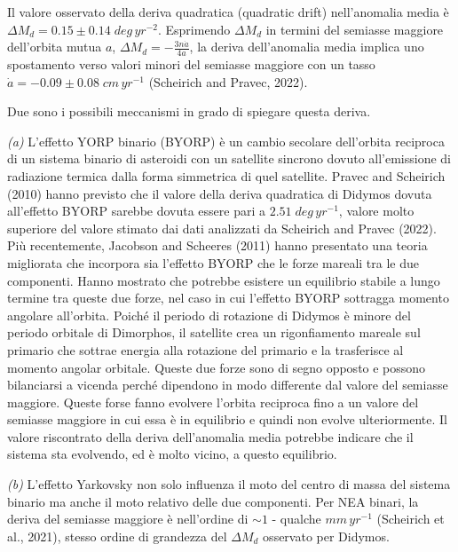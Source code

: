 \documentclass[a4paper,11pt,openright]{book}
\begin{document}
Il valore osservato della deriva quadratica (quadratic drift) nell'anomalia media è $\Delta M_d=0.15\pm 0.14\; deg\,yr^{-2}$. Esprimendo $\Delta M_d$ in termini del semiasse maggiore dell'orbita mutua $a$, $\Delta M_d=-\frac{3n\dot{a}}{4a}$, la deriva dell'anomalia media implica uno spostamento verso valori minori del semiasse maggiore con un tasso \\$\dot{a}=-0.09 \pm 0.08\;cm\,yr^{-1}$ (Scheirich and Pravec, 2022). 

Due sono i possibili meccanismi in grado di spiegare questa deriva.

\qquad \textit{(a)} L'effetto YORP binario (BYORP) è un cambio secolare dell'orbita reciproca di un sistema binario di asteroidi con un satellite sincrono dovuto all'emissione di radiazione termica dalla forma simmetrica di quel satellite. Pravec and Scheirich (2010) hanno previsto che il valore della deriva quadratica di Didymos dovuta all'effetto BYORP sarebbe dovuta essere pari a $2.51\;deg\,yr^{-1}$, valore molto superiore del valore stimato dai dati analizzati da Scheirich and Pravec (2022). Più recentemente, Jacobson and Scheeres (2011) hanno presentato una teoria migliorata che incorpora sia l'effetto BYORP che le forze mareali tra le due componenti. Hanno mostrato che potrebbe esistere un equilibrio stabile a lungo termine tra queste due forze, nel caso in cui l'effetto BYORP sottragga momento angolare all'orbita. Poiché il periodo di rotazione di Didymos è minore del periodo orbitale di Dimorphos, il satellite crea un rigonfiamento mareale sul primario che sottrae energia alla rotazione del primario e la trasferisce al momento angolar orbitale. Queste due forze sono di segno opposto e possono bilanciarsi a vicenda perché dipendono in modo differente dal valore del semiasse maggiore. Queste forse fanno evolvere l'orbita reciproca fino a un valore del semiasse maggiore in cui essa è in equilibrio e quindi non evolve ulteriormente. Il valore riscontrato della deriva dell'anomalia media potrebbe indicare che il sistema sta evolvendo, ed è molto vicino, a questo equilibrio.

\qquad \textit{(b)} L'effetto Yarkovsky non solo influenza il moto del centro di massa del sistema binario ma anche il moto relativo delle due componenti. Per NEA binari, la deriva del semiasse maggiore è nell'ordine di $\sim 1$ - qualche $mm\,yr^{-1}$ (Scheirich et al., 2021), stesso ordine di grandezza del $\Delta M_d$ osservato per Didymos.
\end{document}
